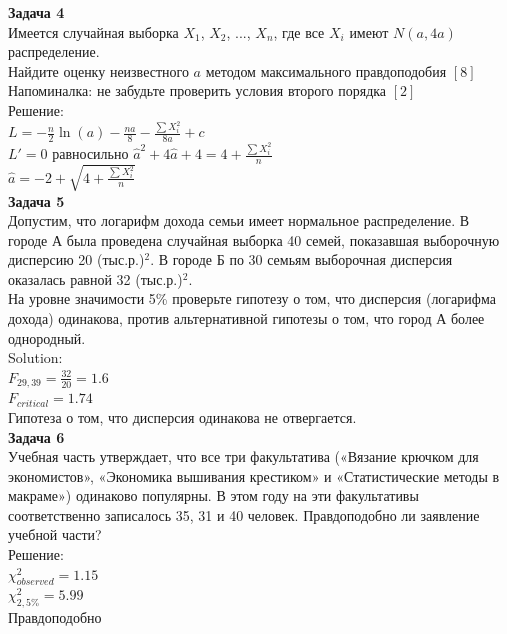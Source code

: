 \documentclass[12pt, a4paper]{article}\usepackage[]{graphicx}\usepackage[]{color}
\begin{document}
	\textbf{Задача 4} \\ %
	Имеется случайная выборка $X_{1}$, $X_{2}$, ..., $X_{n}$, где все $X_{i}$ имеют $N(a,4a)$ распределение. \\
	Найдите оценку неизвестного $a$ методом максимального правдоподобия $[8]$  \\
	Напоминалка: не забудьте проверить условия второго порядка $[2]$ \\
	Решение: \\
	$L=-\frac{n}{2}\ln(a)-\frac{na}{8}-\frac{\sum X_{i}^{2}}{8a}+c$ \\
	$L'=0$ равносильно $\hat{a}^{2}+4\hat{a}+4=4+\frac{\sum X_{i}^{2}}{n}$ \\
	$\hat{a}=-2+\sqrt{4+\frac{\sum X_{i}^{2}}{n}}$ \\

	\textbf{Задача 5} \\ %
	Допустим, что логарифм дохода семьи имеет нормальное распределение. В городе А была проведена случайная выборка 40 семей, показавшая выборочную дисперсию 20 (тыс.р.)$^{2}$. В городе Б по 30 семьям выборочная дисперсия оказалась равной 32 (тыс.р.)$^{2}$. \\
	На уровне значимости 5\% проверьте гипотезу о том, что дисперсия (логарифма дохода) одинакова, против альтернативной гипотезы о том, что город А более однородный. \\
	Solution: \\
	$F_{29,39}=\frac{32}{20}=1.6$ \\
	$F_{critical}=1.74$ \\
	Гипотеза о том, что дисперсия одинакова не отвергается. \\

	\textbf{Задача 6} \\ %
	Учебная часть утверждает, что все три факультатива («Вязание крючком для экономистов», «Экономика вышивания крестиком» и «Статистические методы в макраме») одинаково популярны. В этом году на эти факультативы соответственно записалось 35, 31 и 40 человек. Правдоподобно ли заявление учебной части? \\
	Решение: \\
	$\chi^{2}_{observed}=1.15$ \\
	$\chi^{2}_{2,5\%}=5.99$ \\
	Правдоподобно \\
\end{document}
